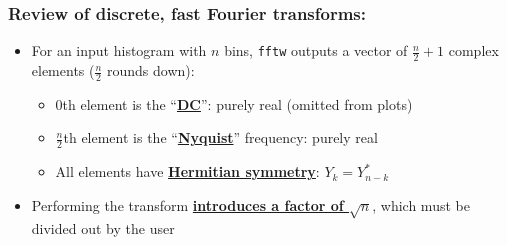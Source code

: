 \documentclass[bigger]{beamer}
\providecommand{\alert}[1]{\textbf{#1}}
\begin{document}
\begin{frame}
\frametitle{Review of discrete, fast Fourier transforms:}
\label{sec-1-1-3}
\begin{itemize}

\item For an input histogram with $n$ bins, \texttt{fftw} outputs a vector of \(\frac{n}{2}+1\) complex elements (\(\frac{n}{2}\) rounds down):
\label{sec-1-1-3-1}%
\begin{itemize}

\item 0th element is the ``\href{http://www.fftw.org/doc/One_002dDimensional-DFTs-of-Real-Data.html}{\alert{DC}}'': purely real (omitted from plots)
\label{sec-1-1-3-1-1}%

\item \(\frac{n}{2}\)th element is the ``\href{http://www.fftw.org/doc/One_002dDimensional-DFTs-of-Real-Data.html}{\alert{Nyquist}}'' frequency: purely real
\label{sec-1-1-3-1-2}%

\item All elements have \href{http://www.fftw.org/doc/The-1d-Real_002ddata-DFT.html}{\alert{Hermitian symmetry}}: \(Y_{k} = Y_{n-k}^{*}\)
\label{sec-1-1-3-1-3}%
\end{itemize} %

\item Performing the transform \href{http://www.fftw.org/doc/The-1d-Real_002ddata-DFT.html}{\alert{introduces a factor of \(\sqrt{n}\)}}, which must be divided out by the user
\label{sec-1-1-3-2}%
\end{itemize} %
\end{frame}
\end{document}
